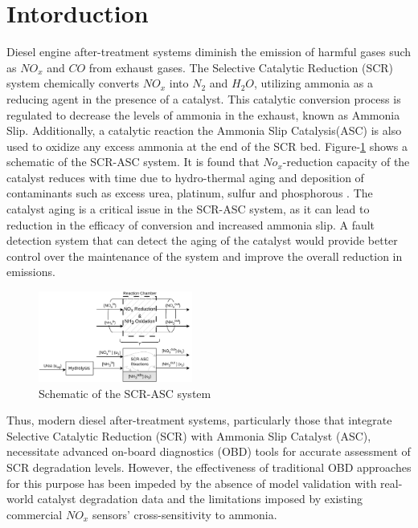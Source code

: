 \section{Intorduction}

Diesel engine after-treatment systems diminish the emission of harmful gases such as $NO_x$ and $CO$ from exhaust gases.
The Selective Catalytic Reduction (SCR) system chemically converts $NO_x$ into $N_2$ and $H_2O$, utilizing ammonia as a
reducing agent in the presence of a catalyst. This catalytic conversion process is regulated to decrease the levels of
ammonia in the exhaust, known as Ammonia Slip. Additionally, a catalytic reaction the Ammonia Slip Catalysis(ASC) is
also used to oxidize any excess ammonia at the end of the SCR bed. Figure-\ref{fig:exhaust_scheme} shows a schematic of
the SCR-ASC system. It is found that $No_x$-reduction capacity of the catalyst reduces with time due to hydro-thermal
aging and deposition of contaminants such as excess urea, platinum, sulfur and phosphorous \cite{jain2023diagnostics}.
The catalyst aging is a critical issue in the SCR-ASC system, as it can lead to reduction in the efficacy of conversion
and increased ammonia slip. A fault detection system that can detect the aging of the catalyst would provide better
control over the maintenance of the system and improve the overall reduction in emissions.

\begin{figure}[ht]
    \centering
    \includegraphics[width=0.45\textwidth]{./figs/1_intro/SCR-ASC_ModelReduction.png}
    \caption{Schematic of the SCR-ASC system}
    \label{fig:exhaust_scheme}
\end{figure}

Thus, modern diesel after-treatment systems, particularly those that integrate Selective Catalytic Reduction (SCR) with
Ammonia Slip Catalyst (ASC), necessitate advanced on-board diagnostics (OBD) tools for accurate assessment of SCR
degradation levels. However, the effectiveness of traditional OBD approaches for this purpose has been impeded by the
absence of model validation with real-world catalyst degradation data and the limitations imposed by existing commercial
$NO_x$ sensors' cross-sensitivity to ammonia.

